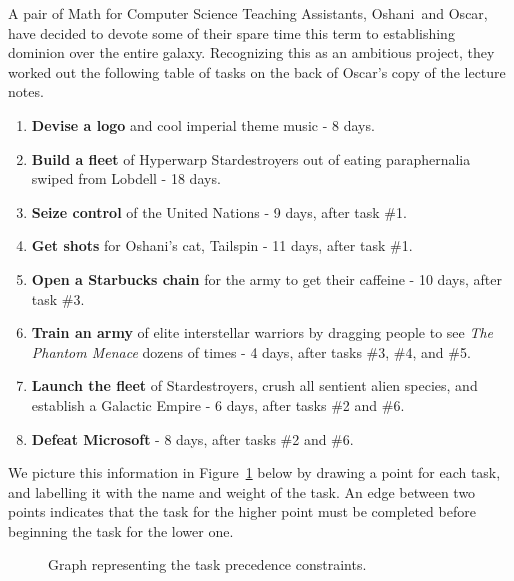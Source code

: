 
\begin{pcomments}
\end{pcomments}


\newcommand{\Jay}{Oshani}
\newcommand{\Rongrong}{Oscar}


\begin{problem}
A pair of Math for Computer Science Teaching Assistants, \Jay\ and
\Rongrong, have decided to devote some of their spare time this term
to establishing dominion over the entire galaxy.  Recognizing this as
an ambitious project, they worked out the following table of tasks on
the back of \Rongrong's copy of the lecture notes.

\begin{enumerate}
\item \textbf{Devise a logo} and cool imperial theme music - 8 days.
\item \textbf{Build a fleet} of Hyperwarp Stardestroyers out of eating
  paraphernalia swiped from Lobdell - 18 days.
\item \textbf{Seize control} of the United Nations - 9 days, after task \#1.
\item \textbf{Get shots} for \Jay's cat, Tailspin - 11 days, after task \#1.
\item \textbf{Open a Starbucks chain} for the army to get their caffeine - 10 
days, after task \#3.
\item \textbf{Train an army} of elite interstellar warriors by dragging
people to see \emph{The Phantom Menace} dozens of times - 4 days, after
tasks \#3, \#4, and \#5.
\item \textbf{Launch the fleet} of Stardestroyers, crush all sentient
alien species, and establish a Galactic Empire - 6 days, after tasks \#2 and
\#6.
\item \textbf{Defeat Microsoft} - 8 days, after tasks \#2 and \#6.
\end{enumerate}

We picture this information in Figure~\ref{fig:tasks} below by drawing a
point for each task, and labelling it with the name and weight of the
task.  An edge between two points indicates that the task for the higher
point must be completed before beginning the task for the lower one.
    \begin{figure}[htbp]
    \begin{center}
    \unitlength=0.047pt
    
    \end{center}
    \caption{Graph representing the task precedence constraints.}
    \label{fig:tasks}
    \end{figure}


\end{problem}
